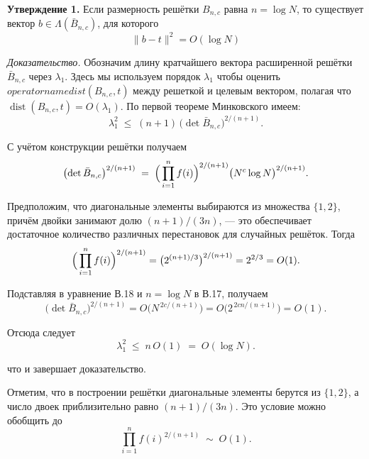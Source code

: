 \textbf{Утверждение 1.} Если размерность решётки $B_{n,c}$ равна
$n = \log N$, то существует вектор $b\in\Lambda(\bar B_{n,c})$, для которого
\begin{equation}
\lVert b - t\rVert^{2} = O(\log N)
\end{equation}

\textit{Доказательство.}
Обозначим длину кратчайшего вектора расширенной решётки $\bar B_{n,c}$ через
$\lambda_{1}$. Здесь мы используем порядок $\lambda_{1}$ чтобы оценить
$operatorname{dist}(B_{n,c},t)$ между решеткой и целевым вектором, полагая что
$\operatorname{dist}(B_{n,c},t)=O(\lambda_{1})$. По первой теореме Минковского
имеем:
\begin{equation}
\lambda_{1}^{2}
\;\le\;
(n+1)\,\bigl(\det\bar B_{n,c}\bigr)^{2/(n+1)}.
\end{equation}

С учётом конструкции решётки получаем
\begin{equation}
\bigl(\det\bar B_{n,c}\bigr)^{2/(n+1)}
\;=\;
\Bigl(\,\prod_{i=1}^{n} f(i)\Bigr)^{2/(n+1)}
\bigl(N^{c}\log N\bigr)^{2/(n+1)} .
\end{equation}

Предположим, что диагональные элементы выбираются из множества $\{1,2\}$,
причём двойки занимают долю $(n+1)/(3n)$, — это обеспечивает достаточное
количество различных перестановок для случайных решёток. Тогда
\begin{equation}
\Bigl(\,\prod_{i=1}^{n} f(i)\Bigr)^{2/(n+1)}
  = \bigl(2^{(n+1)/3}\bigr)^{2/(n+1)}
  = 2^{2/3}
  = O(1).
\end{equation}

Подставляя в уравнение В.18 и $n=\log N$ в В.17, получаем
\begin{equation}
\bigl(\det\bar B_{n,c}\bigr)^{2/(n+1)}
  = O\!\bigl(N^{\,2c/(n+1)}\bigr)
  = O\!\bigl(2^{\,2cn/(n+1)}\bigr)
  = O(1).
\end{equation}

Отсюда следует
\begin{equation}
\lambda_{1}^{2} \;\le\; n\,O(1) \;=\; O(\log N).
\end{equation}

что и завершает доказательство.

Отметим, что в построении решётки диагональные элементы берутся из $\{1,2\}$, а
число двоек приблизительно равно $(n+1)/(3n)$. Это условие можно обобщить до
\begin{equation}
\prod_{i=1}^{n} f(i)^{2/(n+1)} \;\sim\; O(1).
\end{equation}

